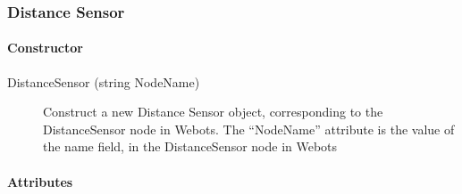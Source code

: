 \subsubsection{Distance Sensor}
\label{webots.uobjects.robotdevices.distancesensor}%

\paragraph{Constructor}
\label{webots.uobjects.robotdevices.distancesensor.constructor}%

\noindent
\begin{description}
\item[{DistanceSensor (string NodeName)}]         Construct a new Distance Sensor object, corresponding to the DistanceSensor node in
          Webots. The ``NodeName'' attribute is the value
          of the name field, in the DistanceSensor node in Webots

\end{description}

\paragraph{Attributes}
\label{webots.uobjects.robotdevices.distancesensor.attributes}%

